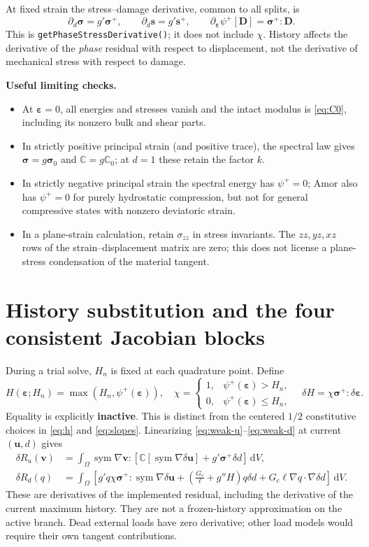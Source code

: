 \documentclass[11pt,a4paper]{article}
\newcommand{\eps}{\bm{\varepsilon}}
\newcommand{\sig}{\bm{\sigma}}
\newcommand{\uu}{\bm{u}}
\newcommand{\vv}{\bm{v}}
\newcommand{\D}{\bm{D}}
\newcommand{\C}{\mathbb{C}}
\newcommand{\sym}{\operatorname{sym}}
\newcommand{\dd}{\,\mathrm{d}}
\newcommand{\code}[1]{\texttt{\small #1}}
\newcommand{\sectionpage}[1]{\clearpage\section{#1}}
\numberwithin{equation}{section}
\begin{document}
At fixed strain the stress--damage derivative, common to all splits, is
\begin{equation}
 \partial_d\sig=g'\sig^+,
 \qquad\partial_d\bm s=g'\bm s^+,
 \qquad\partial_{\eps}\psi^+[\D]=\sig^+:\D.\label{eq:phase-stress}
\end{equation}
This is \code{getPhaseStressDerivative()}; it does not include $\chi$.
History affects the derivative of the \emph{phase} residual with respect to
displacement, not the derivative of mechanical stress with respect to damage.

\textbf{Useful limiting checks.}
\begin{itemize}
\item At $\eps=0$, all energies and stresses vanish and the intact modulus is
\eqref{eq:C0}, including its nonzero bulk and shear parts.
\item In strictly positive principal strain (and positive trace), the spectral
law gives $\sig=g\sig_0$ and $\C=g\C_0$; at $d=1$ these retain the factor $k$.
\item In strictly negative principal strain the spectral energy has $\psi^+=0$;
Amor also has $\psi^+=0$ for purely hydrostatic compression, but not for general
compressive states with nonzero deviatoric strain.
\item In a plane-strain calculation, retain $\sigma_{zz}$ in stress invariants.
The $zz,yz,xz$ rows of the strain--displacement matrix are zero; this does not
license a plane-stress condensation of the material tangent.
\end{itemize}

\sectionpage{History substitution and the four consistent Jacobian blocks}
\label{sec:jacobian}
During a trial solve, $H_n$ is fixed at each quadrature point. Define
\begin{equation}
 H(\eps;H_n)=\max(H_n,\psi^+(\eps)),\quad
 \chi=\begin{cases}1,&\psi^+(\eps)>H_n,\\0,&\psi^+(\eps)\le H_n,\end{cases}
 \quad\delta H=\chi\sig^+:\delta\eps.\label{eq:history}
\end{equation}
Equality is explicitly \textbf{inactive}. This is distinct from the centered
$1/2$ constitutive choices in \eqref{eq:h} and \eqref{eq:slopes}.
Linearizing \eqref{eq:weak-u}--\eqref{eq:weak-d} at current $(\uu,d)$ gives
\begin{align}
 \delta R_u(\vv)&=\int_\Omega\sym\nabla\vv:
       \left[\C[\sym\nabla\delta\uu]+g'\sig^+\delta d\right]\dd V,\\
 \delta R_d(q)&=\int_\Omega\left[g' q\chi\sig^+:\sym\nabla\delta\uu
       +\left(\frac{G_c}{\ell}+g''H\right)q\delta d
       +G_c\ell\nabla q\cdot\nabla\delta d\right]\dd V.
\end{align}
These are derivatives of the implemented residual, including the derivative
of the current maximum history. They are not a frozen-history approximation
on the active branch. Dead external loads have zero derivative; other load
models would require their own tangent contributions.
\end{document}

